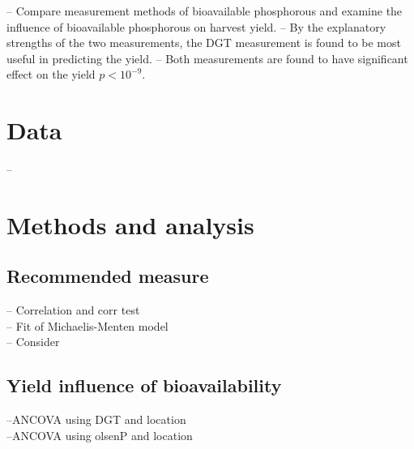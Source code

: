 \documentclass[12pt,fleqn]{article}
\title{}
\author{Asger Schultz}
\date{\today}
\begin{document}
\maketitle
-- Compare measurement methods of bioavailable phosphorous and examine the influence of bioavailable phosphorous on harvest yield. 
-- By the explanatory strengths of the two measurements, the DGT measurement is found to be most useful in predicting the yield.
-- Both measurements are found to have significant effect on the yield \(p<10^{-9}\).
\tableofcontents
\newpage 
\section{Data}
--


\section{Methods and analysis}
\subsection{Recommended measure}
-- Correlation and corr test\\
-- Fit of Michaelis-Menten model\\
-- Consider 
\subsection{Yield influence of bioavailability}
--ANCOVA using DGT and location\\
--ANCOVA using olsenP and location
\end{document}
